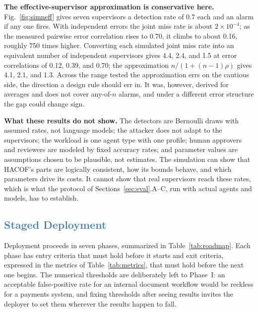 \documentclass[journal]{IEEEtran}
\newcommand{\hacof}{HACOF}
\begin{document}
\textbf{The effective-supervisor approximation is conservative here.} Fig.~\ref{fig:simneff} gives seven supervisors a detection rate of 0.7 each and an alarm if any one fires. With independent errors the joint miss rate is about $2\times10^{-4}$; as the measured pairwise error correlation rises to 0.70, it climbs to about 0.16, roughly 750 times higher. Converting each simulated joint miss rate into an equivalent number of independent supervisors gives 4.4, 2.4, and 1.5 at error correlations of 0.12, 0.39, and 0.70; the approximation $n/(1+(n-1)\rho)$ gives 4.1, 2.1, and 1.3. Across the range tested the approximation errs on the cautious side, the direction a design rule should err in. It was, however, derived for averages and does not cover any-of-$n$ alarms, and under a different error structure the gap could change sign.

\textbf{What these results do not show.} The detectors are Bernoulli draws with assumed rates, not language models; the attacker does not adapt to the supervisors; the workload is one agent type with one profile; human approvers and reviewers are modeled by fixed accuracy rates; and parameter values are assumptions chosen to be plausible, not estimates. The simulation can show that \hacof{}'s parts are logically consistent, how its bounds behave, and which parameters drive its costs. It cannot show that real supervisors reach these rates, which is what the protocol of Sections~\ref{sec:eval}.A--C, run with actual agents and models, has to establish.

\subsection{\textcolor{steelblue}{Staged Deployment}}
\label{sec:eval-roadmap}

Deployment proceeds in seven phases, summarized in Table~\ref{tab:roadmap}. Each phase has entry criteria that must hold before it starts and exit criteria, expressed in the metrics of Table~\ref{tab:metrics}, that must hold before the next one begins. The numerical thresholds are deliberately left to Phase~I: an acceptable false-positive rate for an internal document workflow would be reckless for a payments system, and fixing thresholds after seeing results invites the deployer to set them wherever the results happen to fall.
\end{document}

